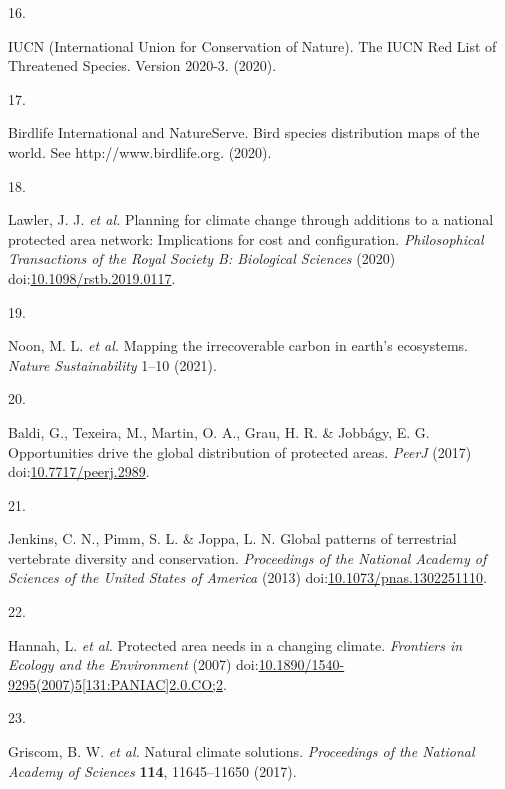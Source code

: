 \documentclass[3p]{elsarticle} %
\newlength{\cslhangindent}
\newlength{\csllabelwidth}
\newlength{\cslentryspacingunit} %
\newenvironment{CSLReferences}[2] %
 {%
  \setlength{\parindent}{0pt}
  \ifodd #1
  \let\oldpar\par
  \def\par{\hangindent=\cslhangindent\oldpar}
  \fi
  \setlength{\parskip}{#2\cslentryspacingunit}
 }%
 {}
\newcommand{\CSLLeftMargin}[1]{\parbox[t]{\csllabelwidth}{#1}}
\newcommand{\CSLRightInline}[1]{\parbox[t]{\linewidth - \csllabelwidth}{#1}\break}
\begin{document}
\begin{CSLReferences}{0}{0}
\leavevmode{}%
\CSLLeftMargin{16. }
\CSLRightInline{IUCN (International Union for Conservation of Nature).
{The IUCN Red List of Threatened Species. Version 2020-3}. (2020).}

\leavevmode{}%
\CSLLeftMargin{17. }
\CSLRightInline{Birdlife International and NatureServe. {Bird species
distribution maps of the world. See http://www.birdlife.org}. (2020).}

\leavevmode{}%
\CSLLeftMargin{18. }
\CSLRightInline{Lawler, J. J. \emph{et al.} {Planning for climate change
through additions to a national protected area network: Implications for
cost and configuration}. \emph{Philosophical Transactions of the Royal
Society B: Biological Sciences} (2020)
doi:\href{https://doi.org/10.1098/rstb.2019.0117}{10.1098/rstb.2019.0117}.}

\leavevmode{}%
\CSLLeftMargin{19. }
\CSLRightInline{Noon, M. L. \emph{et al.} Mapping the irrecoverable
carbon in earth's ecosystems. \emph{Nature Sustainability} 1--10
(2021).}

\leavevmode{}%
\CSLLeftMargin{20. }
\CSLRightInline{Baldi, G., Texeira, M., Martin, O. A., Grau, H. R. \&
Jobbágy, E. G. {Opportunities drive the global distribution of protected
areas}. \emph{PeerJ} (2017)
doi:\href{https://doi.org/10.7717/peerj.2989}{10.7717/peerj.2989}.}

\leavevmode{}%
\CSLLeftMargin{21. }
\CSLRightInline{Jenkins, C. N., Pimm, S. L. \& Joppa, L. N. {Global
patterns of terrestrial vertebrate diversity and conservation}.
\emph{Proceedings of the National Academy of Sciences of the United
States of America} (2013)
doi:\href{https://doi.org/10.1073/pnas.1302251110}{10.1073/pnas.1302251110}.}

\leavevmode{}%
\CSLLeftMargin{22. }
\CSLRightInline{Hannah, L. \emph{et al.} {Protected area needs in a
changing climate}. \emph{Frontiers in Ecology and the Environment}
(2007)
doi:\href{https://doi.org/10.1890/1540-9295(2007)5\%5B131:PANIAC\%5D2.0.CO;2}{10.1890/1540-9295(2007)5{[}131:PANIAC{]}2.0.CO;2}.}

\leavevmode{}%
\CSLLeftMargin{23. }
\CSLRightInline{Griscom, B. W. \emph{et al.} {Natural climate
solutions}. \emph{Proceedings of the National Academy of Sciences}
\textbf{114}, 11645--11650 (2017).}


\end{CSLReferences}
\end{document}
